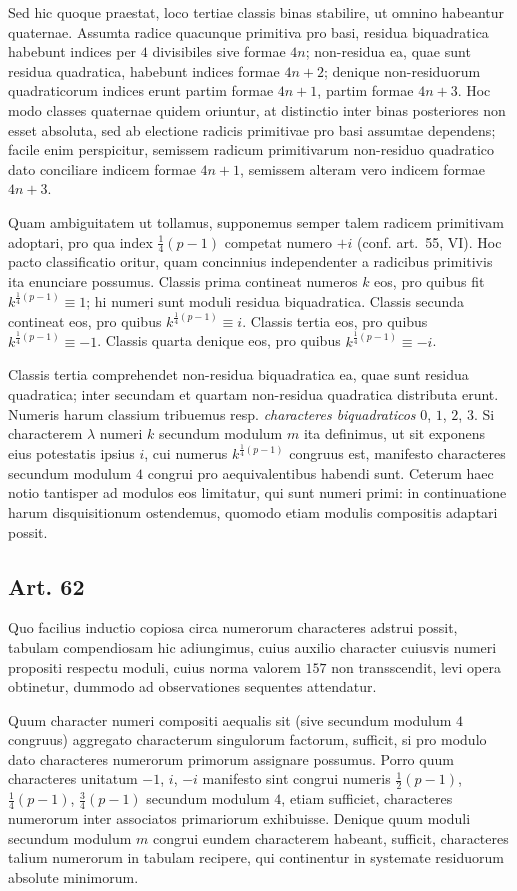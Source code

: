 \documentclass[12pt]{article}
\newcommand{\art}[1]{\subsection*{Art. #1}}
\begin{document}
Sed hic quoque praestat, loco tertiae classis binas stabilire, ut omnino habeantur quaternae. Assumta radice quacunque primitiva pro basi, residua biquadratica habebunt indices per $4$ divisibiles sive formae $4n$; non-residua ea, quae sunt residua quadratica, habebunt indices formae $4n+2$; denique non-residuorum quadraticorum indices erunt partim formae $4n+1$, partim formae $4n+3$. Hoc modo classes quaternae quidem oriuntur, at distinctio inter binas posteriores non esset absoluta, sed ab electione radicis primitivae pro basi assumtae dependens; facile enim perspicitur, semissem radicum primitivarum non-residuo quadratico dato conciliare indicem formae $4n+1$, semissem alteram vero indicem formae $4n+3$.

Quam ambiguitatem ut tollamus, supponemus semper talem radicem primitivam adoptari, pro qua index $\frac14(p-1)$ competat numero $+i$ (conf. art.~55, VI). Hoc pacto classificatio oritur, quam concinnius independenter a radicibus primitivis ita enunciare possumus. Classis prima contineat numeros $k$ eos, pro quibus fit $k^{\frac14(p-1)}\equiv1$; hi numeri sunt moduli residua biquadratica. Classis secunda contineat eos, pro quibus $k^{\frac14(p-1)}\equiv i$. Classis tertia eos, pro quibus $k^{\frac14(p-1)}\equiv-1$. Classis quarta denique eos, pro quibus $k^{\frac14(p-1)}\equiv-i$.

Classis tertia comprehendet non-residua biquadratica ea, quae sunt residua quadratica; inter secundam et quartam non-residua quadratica distributa erunt. Numeris harum classium tribuemus resp. \textit{characteres biquadraticos} $0$, $1$, $2$, $3$. Si characterem $\lambda$ numeri $k$ secundum modulum $m$ ita definimus, ut sit exponens eius potestatis ipsius $i$, cui numerus $k^{\frac14(p-1)}$ congruus est, manifesto characteres secundum modulum $4$ congrui pro aequivalentibus habendi sunt. Ceterum haec notio tantisper ad modulos eos limitatur, qui sunt numeri primi: in continuatione harum disquisitionum ostendemus, quomodo etiam modulis compositis adaptari possit.

\art{62}
Quo facilius inductio copiosa circa numerorum characteres adstrui possit, tabulam compendiosam hic adiungimus, cuius auxilio character cuiusvis numeri propositi respectu moduli, cuius norma valorem $157$ non transscendit, levi opera obtinetur, dummodo ad observationes sequentes attendatur.

Quum character numeri compositi aequalis sit (sive secundum modulum $4$ congruus) aggregato characterum singulorum factorum, sufficit, si pro modulo dato characteres numerorum primorum assignare possumus. Porro quum characteres unitatum $-1$, $i$, $-i$ manifesto sint congrui numeris $\frac12(p-1)$, $\frac14(p-1)$, $\frac34(p-1)$ secundum modulum $4$, etiam sufficiet, characteres numerorum inter associatos primariorum exhibuisse. Denique quum moduli secundum modulum $m$ congrui eundem characterem habeant, sufficit, characteres talium numerorum in tabulam recipere, qui continentur in systemate residuorum absolute minimorum.
\end{document}
